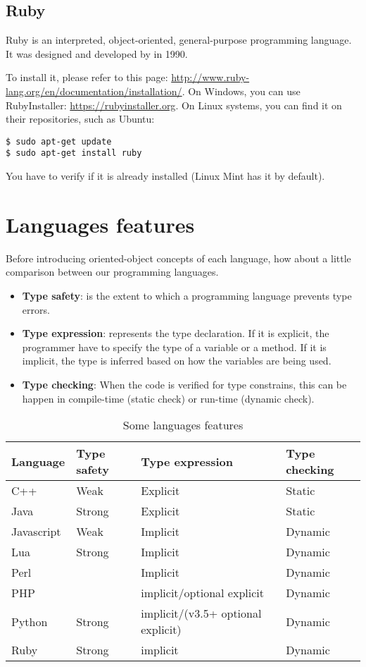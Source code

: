 \documentclass{KodeBook}
\begin{document}
\subsection{Ruby}

Ruby is an interpreted, object-oriented, general-purpose programming language. 
It was designed and developed by  in 1990.

To install it, please refer to this page: \url{http://www.ruby-lang.org/en/documentation/installation/}. 
On Windows, you can use RubyInstaller: \url{https://rubyinstaller.org}.
On Linux systems, you can find it on their repositories, such as Ubuntu:
\begin{lstlisting}[style=shellStyle]
$ sudo apt-get update
$ sudo apt-get install ruby
\end{lstlisting}
You have to verify if it is already installed (Linux Mint has it by default).


\section{Languages features}

Before introducing oriented-object concepts of each language, how about a little comparison between our programming languages.

\begin{itemize}
	\item \textbf{Type safety}: is the extent to which a programming language prevents type errors. 
	\item \textbf{Type expression}: represents the type declaration. If it is explicit, the programmer have to specify the type of a variable or a method. If it is implicit, the type is inferred based on how the variables are being used.
	\item \textbf{Type checking}: When the code is verified for type constrains, this can be happen in compile-time (static check) or run-time (dynamic check).
\end{itemize}


\begin{table}[!ht]
	\label{tab-comp}
	\caption{Some languages features}
	\centering
	\begin{tabular}{llll}
		\hline
		Language & Type safety & Type expression & Type checking \\
		\hline
		C++ & Weak & Explicit & Static \\
		\hline
		Java & Strong & Explicit & Static \\
		\hline
		Javascript & Weak & Implicit & Dynamic \\
		\hline
		Lua & Strong & Implicit & Dynamic \\
		\hline
		Perl & & Implicit & Dynamic \\
		\hline
		PHP & & implicit/optional explicit & Dynamic \\
		\hline
		Python & Strong & implicit/(v3.5+ optional explicit) & Dynamic \\
		\hline
		Ruby & Strong & implicit & Dynamic \\
		\hline
	\end{tabular}
\end{table}
\end{document}
